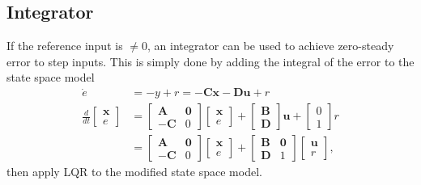 \subsection{Integrator}
If the reference input is $\neq 0$, an integrator can be used to achieve zero-steady error to step inputs.
This is simply done by adding the integral of the error to the state space model
\noindent\begin{align*}
    \dot{e} & =-y+r =  -\mathbf{Cx} - \mathbf{Du} + r \\
    \frac d{dt}
    \begin{bmatrix}
        \mathbf{x} \\
        e
    \end{bmatrix}
            & =\begin{bmatrix}
                   \mathbf{A}  & \mathbf{0} \\
                   -\mathbf{C} & 0
               \end{bmatrix}
    \begin{bmatrix}
        \mathbf{x} \\
        e
    \end{bmatrix}
    +\begin{bmatrix}
         \mathbf{B} \\
         \mathbf{D}
     \end{bmatrix}
    \mathbf{u}+
    \begin{bmatrix}
        0 \\
        1
    \end{bmatrix}
    r                                                 \\
            & =\begin{bmatrix}
                   \mathbf{A}  & \mathbf{0} \\
                   -\mathbf{C} & 0
               \end{bmatrix}
    \begin{bmatrix}
        \mathbf{x} \\
        e
    \end{bmatrix}
    +\begin{bmatrix}
         \mathbf{B} & \mathbf{0} \\
         \mathbf{D} & 1
     \end{bmatrix}
    \begin{bmatrix}
        \mathbf{u} \\
        r
    \end{bmatrix},
\end{align*}
then apply LQR to the modified state space model.

